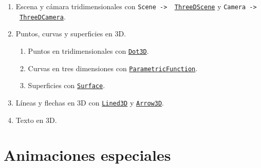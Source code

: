 \documentclass[a4paper]{article}
\begin{document}
\begin{enumerate}

    \item Escena y cámara tridimensionales con \texttt{Scene -> \ \href{https://docs.manim.community/en/v0.16.0.post0/reference/manim.scene.three_d_scene.ThreeDScene.html?highlight=ThreeDScene}{ThreeDScene}} y \texttt{Camera -> \ \href{https://docs.manim.community/en/v0.16.0.post0/reference/manim.camera.three_d_camera.ThreeDCamera.html?highlight=ThreeDCamera}{ThreeDCamera}}.

    \item Puntos, curvas y superficies en 3D.
    \begin{enumerate}[label=2.\arabic*]

        \item Puntos en tridimensionales con \href{https://docs.manim.community/en/v0.16.0.post0/reference/manim.mobject.three_d.three_dimensions.Dot3D.html?highlight=Dot3D}{\texttt{Dot3D}}.

        \item Curvas en tres dimensiones con \href{https://docs.manim.community/en/v0.16.0.post0/reference/manim.mobject.graphing.functions.ParametricFunction.html?highlight=ParametricFunction#threedparametricspring}{\texttt{ParametricFunction}}.

        \item Superficies con \href{https://docs.manim.community/en/v0.16.0.post0/reference/manim.mobject.three_d.three_dimensions.Surface.html?highlight=Curve3D}{\texttt{Surface}}.
    \end{enumerate}

    \item Líneas y flechas en 3D con \href{https://docs.manim.community/en/v0.16.0.post0/reference/manim.mobject.three_d.three_dimensions.Line3D.html?highlight=Line3D}{\texttt{Lined3D}} y \href{https://docs.manim.community/en/v0.16.0.post0/reference/manim.mobject.three_d.three_dimensions.Arrow3D.html?highlight=Arrow3D}{\texttt{Arrow3D}}.

    \item Texto en 3D.
\end{enumerate}

\section{Animaciones especiales} \label{Sec: Animaciones especiales}
\end{document}
